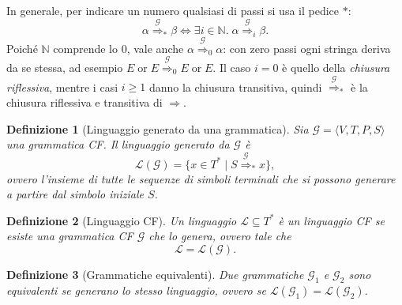 \documentclass[a4paper, 11pt, oneside]{book}
\theoremstyle{formale}
\newtheorem*{definition}{Definizione}
\begin{document}
    In generale, per indicare un numero qualsiasi di passi si usa il pedice $*$:
    \begin{equation*}
        \alpha \overset{\mathcal{G}}{\Rightarrow}_* \beta \iff
        \exists i \in \mathbb{N}.\; \alpha \overset{\mathcal{G}}{\Rightarrow}_i \beta.
    \end{equation*}
    Poich\'e $\mathbb{N}$ comprende lo $0$, vale anche
    $\alpha \overset{\mathcal{G}}{\Rightarrow}_0 \alpha$: con zero passi ogni stringa
    deriva da se stessa, ad esempio
    $E \;\mathrm{or}\; E \overset{\mathcal{G}}{\Rightarrow}_0 E \;\mathrm{or}\; E$. Il caso
    $i = 0$ \`e quello della \emph{chiusura riflessiva}, mentre i casi $i \geq 1$ danno la
    chiusura transitiva, quindi $\overset{\mathcal{G}}{\Rightarrow}_*$ \`e la chiusura
    riflessiva e transitiva di $\Rightarrow$.

    \begin{definition}[Linguaggio generato da una grammatica]
        Sia $\mathcal{G} = \langle V, T, P, S \rangle$ una grammatica CF. Il
        \emph{linguaggio generato} da $\mathcal{G}$ \`e
        \begin{equation*}
            \mathcal{L}(\mathcal{G}) = \{x \in T^* \mid
            S \overset{\mathcal{G}}{\Rightarrow}_* x\},
        \end{equation*}
        ovvero l'insieme di tutte le sequenze di simboli terminali che si possono generare a
        partire dal simbolo iniziale $S$.
    \end{definition}

    \begin{definition}[Linguaggio CF]
        Un linguaggio $\mathcal{L} \subseteq T^*$ \`e un \emph{linguaggio CF} se esiste una
        grammatica CF $\mathcal{G}$ che lo genera, ovvero tale che
        \begin{equation*}
            \mathcal{L} = \mathcal{L}(\mathcal{G}).
        \end{equation*}
    \end{definition}

    \begin{definition}[Grammatiche equivalenti]
        Due grammatiche $\mathcal{G}_1$ e $\mathcal{G}_2$ sono \emph{equivalenti} se
        generano lo stesso linguaggio, ovvero se
        $\mathcal{L}(\mathcal{G}_1) = \mathcal{L}(\mathcal{G}_2)$.
    \end{definition}
\end{document}
